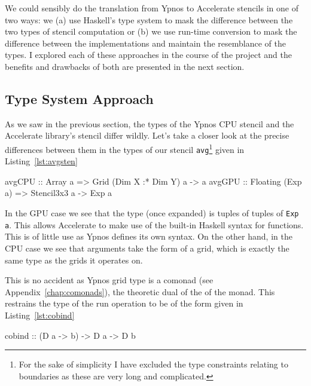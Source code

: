 \documentclass[12pt,a4paper,twoside]{scrbook}
\begin{document}
We could sensibly do the translation from Ypnos to Accelerate stencils in one of
two ways: we (a) use Haskell's type system to mask the difference between the
two types of stencil computation or (b) we use run-time conversion to mask the
difference between the implementations and maintain the resemblance of the
types. I explored each of these approaches in the course of the project and the
benefits and drawbacks of both are presented in the next section.

\subsection{Type System Approach}
\label{sec:typesysapp}

As we saw in the previous section, the types of the Ypnos CPU stencil and the
Accelerate library's stencil differ wildly. Let's take a closer look at the
precise differences between them in the types of our stencil
\texttt{avg}\footnote{For the sake of simplicity I have excluded the type
  constraints relating to boundaries as these are very long and complicated.}
given in Listing~\ref{lst:avgsten}

\begin{hflisting}[label={lst:avgsten}, caption={The average function implemented
    on both the CPU and GPU. Notice how the types differ. The expression
    \texttt{Dim X :* Dim Y} denotes a 2D grid.}]
avgCPU :: Array a =>
          Grid (Dim X :* Dim Y) a -> a
avgGPU :: Floating (Exp a) =>
          Stencil3x3 a -> Exp a
\end{hflisting}

In the GPU case we see that the type (once expanded) is tuples of tuples of
\texttt{Exp a}. This allows Accelerate to make use of the built-in Haskell
syntax for functions. This is of little use as Ypnos defines its own syntax. On
the other hand, in the CPU case we see that arguments take the form of a grid,
which is exactly the same type as the grids it operates on.

This is no accident as Ypnos grid type is a comonad (see
Appendix~\ref{chap:comonads}), the theoretic dual of the of the monad. This
restrains the type of the run operation to be of the form given in
Listing~\ref{lst:cobind}

\begin{hflisting}[label={lst:cobind}, caption={The definition of cobind. Let
    \texttt{D} be a grid of a certain dimension and \texttt{a} and \texttt{b} be
    the types of that grid.}]
cobind :: (D a -> b) -> D a -> D b
\end{hflisting}
\end{document}
